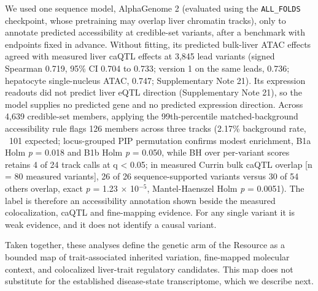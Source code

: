 We used one sequence model, AlphaGenome 2 (evaluated using the \texttt{ALL\_FOLDS} checkpoint, whose pretraining may overlap liver chromatin tracks), only to annotate predicted accessibility at credible-set variants, after a benchmark with endpoints fixed in advance. Without fitting, its predicted bulk-liver ATAC effects agreed with measured liver caQTL effects at 3,845 lead variants (signed Spearman 0.719, 95\% CI 0.704 to 0.733; version 1 on the same leads, 0.736; hepatocyte single-nucleus ATAC, 0.747; Supplementary Note 21). Its expression readouts did not predict liver eQTL direction (Supplementary Note 21), so the model supplies no predicted gene and no predicted expression direction. Across 4,639 credible-set members, applying the 99th-percentile matched-background accessibility rule flags 126 members across three tracks (2.17\% background rate, ~101 expected; locus-grouped PIP permutation confirms modest enrichment, B1a Holm \emph{p} = 0.018 and B1b Holm \emph{p} = 0.050, while BH over per-variant scores retains 4 of 24 track calls at q \textless{} 0.05; in measured Currin bulk caQTL overlap [n = 80 measured variants], 26 of 26 sequence-supported variants versus 30 of 54 others overlap, exact \emph{p} = 1.23 $\times$ 10$^{-5}$, Mantel-Haenszel Holm \emph{p} = 0.0051). The label is therefore an accessibility annotation shown beside the measured colocalization, caQTL and fine-mapping evidence. For any single variant it is weak evidence, and it does not identify a causal variant.

Taken together, these analyses define the genetic arm of the Resource as a bounded map of trait-associated inherited variation, fine-mapped molecular context, and colocalized liver-trait regulatory candidates. This map does not substitute for the established disease-state transcriptome, which we describe next.
